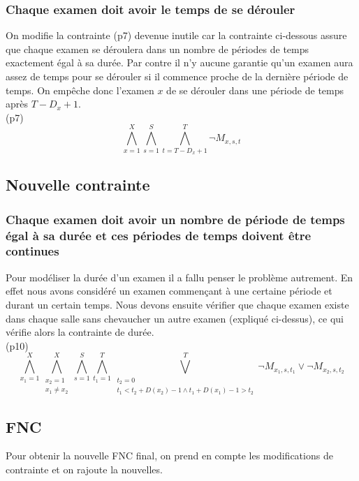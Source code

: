 \documentclass[a4paper,11pt]{article}
\begin{document}
\subsubsection{Chaque examen doit avoir le temps de se dérouler}
On modifie la contrainte (p7) devenue inutile car la contrainte ci-dessous assure que chaque examen se déroulera dans un nombre de périodes de temps exactement égal à sa durée. Par contre il n'y aucune garantie qu'un examen aura assez de temps pour se dérouler si il commence proche de la dernière période de temps. On empêche donc l'examen $x$ de se dérouler dans une période de temps après $ T - D_{x} + 1 $.\\
(p7)
\begin{displaymath}
\bigwedge\limits_{x=1}^{X}\bigwedge\limits_{s=1}^{S}\bigwedge\limits_{t=T - D_{x} + 1}^{T} \neg M_{x, s, t}
\end{displaymath}


\subsection{Nouvelle contrainte}

\subsubsection{Chaque examen doit avoir un nombre de période de temps égal à sa durée et ces périodes de temps doivent être continues}
Pour modéliser la durée d'un examen il a fallu penser le problème autrement. En effet nous avons considéré un examen commençant à une certaine période et durant un certain temps. Nous devons ensuite vérifier que chaque examen existe dans chaque salle sans chevaucher un autre examen (expliqué ci-dessus), ce qui vérifie alors la contrainte de durée.\\

(p10)
\begin{displaymath}
\bigwedge\limits_{x_{1}=1}^{X}\bigwedge\limits_{\substack{x_{2}=1 \\ x_{1} \neq x_{2}}}^{X}\bigwedge\limits_{s=1}^{S}\bigwedge\limits_{t_{1}=1}^{T}\bigvee\limits_{\substack{t_{2}=0 \\ t_{1} < t_{2} + D(x_{2})-1 \wedge t_{1} + D(x_{1})-1 > t_{2}}}^{T} \neg M_{x_{1}, s, t_{1}} \vee \neg M_{x_{2}, s, t_{2}}
\end{displaymath}

\subsection{FNC}
Pour obtenir la nouvelle FNC final, on prend en compte les modifications de contrainte et on rajoute la nouvelles.
\end{document}

